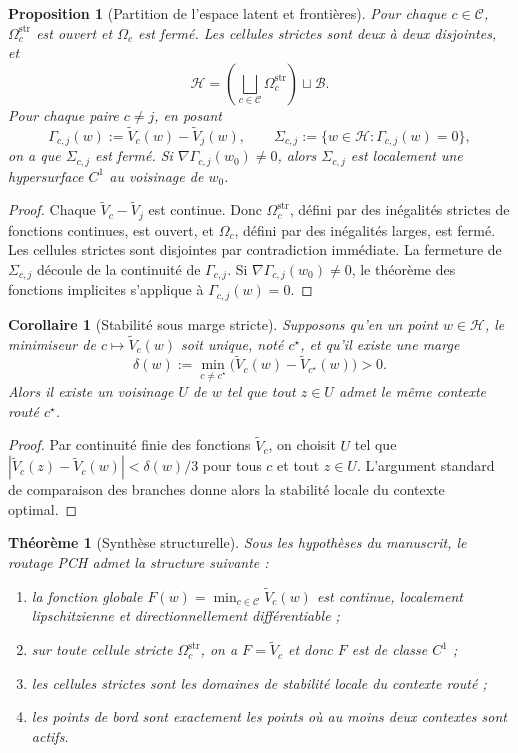 \documentclass[11pt,a4paper]{article}
\newtheorem{proposition}{Proposition}[section]
\newtheorem{theorem}{Théorème}[section]
\newtheorem{corollary}{Corollaire}[section]
\newcommand{\Hh}{\mathcal H}
\newcommand{\Ccal}{\mathcal C}
\newcommand{\Bcal}{\mathcal B}
\begin{document}
\begin{proposition}[Partition de l'espace latent et frontières]
Pour chaque \(c\in\Ccal\), \(\Omega_c^{\mathrm{str}}\) est ouvert et \(\Omega_c\) est fermé. Les cellules strictes sont deux à deux disjointes, et
\[
\Hh=\left(\bigsqcup_{c\in\Ccal}\Omega_c^{\mathrm{str}}\right)\sqcup \Bcal.
\]
Pour chaque paire \(c\neq j\), en posant
\[
\Gamma_{c,j}(w):=\widetilde V_c(w)-\widetilde V_j(w),
\qquad
\Sigma_{c,j}:=\{w\in\Hh:\Gamma_{c,j}(w)=0\},
\]
on a que \(\Sigma_{c,j}\) est fermé. Si \(\nabla\Gamma_{c,j}(w_0)\neq 0\), alors \(\Sigma_{c,j}\) est localement une hypersurface \(C^1\) au voisinage de \(w_0\).
\end{proposition}

\begin{proof}
Chaque \(\widetilde V_c-\widetilde V_j\) est continue. Donc \(\Omega_c^{\mathrm{str}}\), défini par des inégalités strictes de fonctions continues, est ouvert, et \(\Omega_c\), défini par des inégalités larges, est fermé. Les cellules strictes sont disjointes par contradiction immédiate. La fermeture de \(\Sigma_{c,j}\) découle de la continuité de \(\Gamma_{c,j}\). Si \(\nabla\Gamma_{c,j}(w_0)\neq 0\), le théorème des fonctions implicites s'applique à \(\Gamma_{c,j}(w)=0\).
\end{proof}

\begin{corollary}[Stabilité sous marge stricte]
Supposons qu'en un point \(w\in\Hh\), le minimiseur de \(c\mapsto\widetilde V_c(w)\) soit unique, noté \(c^\star\), et qu'il existe une marge
\[
\delta(w):=\min_{c\neq c^\star}\bigl(\widetilde V_c(w)-\widetilde V_{c^\star}(w)\bigr)>0.
\]
Alors il existe un voisinage \(U\) de \(w\) tel que tout \(z\in U\) admet le même contexte routé \(c^\star\).
\end{corollary}

\begin{proof}
Par continuité finie des fonctions \(\widetilde V_c\), on choisit \(U\) tel que \(|\widetilde V_c(z)-\widetilde V_c(w)|<\delta(w)/3\) pour tous \(c\) et tout \(z\in U\). L'argument standard de comparaison des branches donne alors la stabilité locale du contexte optimal.
\end{proof}

\begin{theorem}[Synthèse structurelle]
Sous les hypothèses du manuscrit, le routage PCH admet la structure suivante :
\begin{enumerate}[leftmargin=2em]
\item la fonction globale \(F(w)=\min_{c\in\Ccal}\widetilde V_c(w)\) est continue, localement lipschitzienne et directionnellement différentiable ;
\item sur toute cellule stricte \(\Omega_c^{\mathrm{str}}\), on a \(F=\widetilde V_c\) et donc \(F\) est de classe \(C^1\) ;
\item les cellules strictes sont les domaines de stabilité locale du contexte routé ;
\item les points de bord sont exactement les points où au moins deux contextes sont actifs.
\end{enumerate}
\end{theorem}
\end{document}
